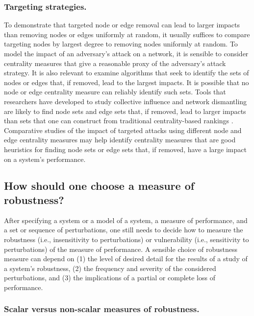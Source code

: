 \documentclass{comnet-mod}
\begin{document}
\subsubsection{Targeting strategies.}

To demonstrate that targeted node or edge removal can lead to larger impacts than removing nodes or edges uniformly at random, it usually suffices to compare targeting nodes by largest degree to removing nodes uniformly at random. To model the impact of an adversary's attack on a network, it is sensible to consider centrality measures that give a reasonable proxy of the adversary's attack strategy. 
It is also relevant to examine algorithms that seek to identify the sets of nodes or edges that, if removed, lead to the largest impacts. It is possible that no node or edge centrality measure can reliably identify such sets. Tools that researchers have developed to study collective influence \cite{Morone2015, Lue2016, Morone2016, Zhu2018, Pei2019} and network dismantling \cite{Braunstein2016, Zdeborova2016, Ren2019} are likely to find node sets and edge sets that, if removed, lead to larger impacts than sets that one can construct from traditional centrality-based rankings \cite{Braunstein2016, Ren2019}. 
Comparative studies of the impact of targeted attacks using different node and edge centrality measures may help identify centrality measures that are good heuristics for finding node sets or edge sets that, if removed, have a large impact on a system's performance.


\subsection{How should one choose a measure of robustness?}

After specifying a system or a model of a system, a measure of performance, and a set or sequence of perturbations, one still needs to decide how to measure the robustness (i.e., insensitivity to perturbations) or vulnerability (i.e., sensitivity to perturbations) of the measure of performance. A sensible choice of robustness measure can depend on (1) the level of desired detail for the results of a study of a system's robustness, (2) the frequency and severity of the considered perturbations, and (3) the implications of a partial or complete loss of performance.


\subsubsection{Scalar versus non-scalar measures of robustness.}
\end{document}
